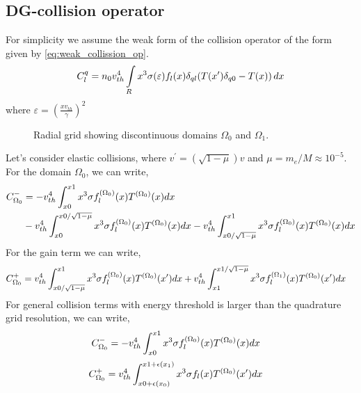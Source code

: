 \documentclass{article}[draft]
\begin{document}
\subsection{DG-collision operator}
For simplicity we assume the weak form of the collision operator of the form given by \eqref{eq:weak_collission_op}.
\begin{align}
	C^{q}_{l}  = n_0 v_{th}^4 \myint_{R} x^3 \sigma\of{\varepsilon} f_{l}\of{x} \delta_{ql} \of{T\of{x^\prime}\delta_{q0} - T\of{x}} \diff{x} \label{eq:weak_collission_op}
\end{align}where $\varepsilon=(\frac{x v_{th}}{\gamma})^2$
\begin{figure}[H]
\centering
{}
\caption{Radial grid showing discontinuous domains $\Omega_0$ and $\Omega_1$.}
\end{figure}
Let's consider elastic collisions, where $v^\prime = (\sqrt{1-\mu})v$ and $\mu=m_e/M \approx 10^{-5}$.
For the domain $\Omega_0$, we can write, 
\begin{align}
	C_{\Omega_0}^{-} &= -v_{th}^4\int_{x0}^{x1} x^3 \sigma f_{l}^{(\Omega_0)}\of{x} T^{(\Omega_0)}\of{x} dx \\
		& -v_{th}^4\int_{x0}^{x0/\sqrt{1-\mu}} x^3 \sigma f_{l}^{(\Omega_0)}\of{x} T^{(\Omega_0)}\of{x} dx -v_{th}^4 \int_{x0/\sqrt{1-\mu}}^{x1}x^3 \sigma f_{l}^{(\Omega_0)}\of{x} T^{(\Omega_0)}\of{x} dx
\end{align}
For the gain term we can write, 
\begin{align}
	C_{\Omega_0}^{+} &= v_{th}^4\int_{x0/\sqrt{1-\mu}}^{x1} x^3 \sigma f_{l}^{(\Omega_0)}\of{x} T^{(\Omega_0)}\of{x^\prime} dx + v_{th}^4\int_{x1}^{x1/\sqrt{1-\mu}} x^3 \sigma f_{l}^{(\Omega_1)}\of{x} T^{(\Omega_0)}\of{x^\prime}dx
\end{align}
For general collision terms with energy threshold is larger than the quadrature grid resolution, we can write, 
\begin{align}
	C_{\Omega_0}^{-} &= -v_{th}^4\int_{x0}^{x1} x^3 \sigma f_{l}^{(\Omega_0)}\of{x} T^{(\Omega_0)}\of{x} dx
\end{align}
\begin{align}
	C_{\Omega_0}^{+} &= v_{th}^4\int_{x0 + \epsilon(x_0)}^{x1 + \epsilon(x_1)} x^3 \sigma f_{l}\of{x} T^{(\Omega_0)}\of{x^\prime} dx
\end{align}
\end{document}
